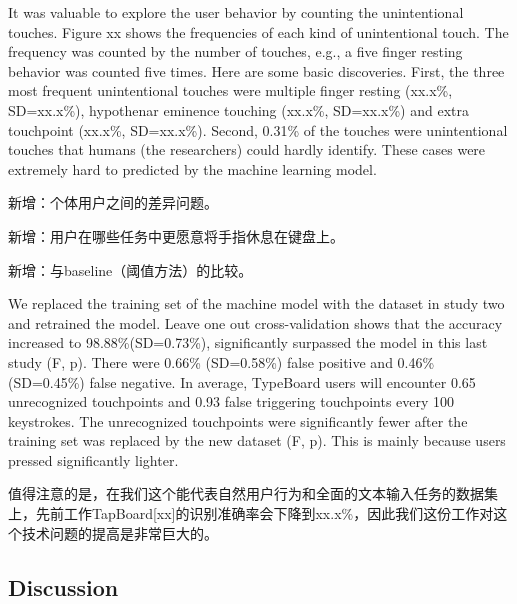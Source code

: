 
It was valuable to explore the user behavior by counting the unintentional touches. Figure xx shows the frequencies of each kind of unintentional touch. The frequency was counted by the number of touches, e.g., a five finger resting behavior was counted five times. Here are some basic discoveries. First, the three most frequent unintentional touches were multiple finger resting (xx.x\%, SD=xx.x\%), hypothenar eminence touching (xx.x\%, SD=xx.x\%) and extra touchpoint (xx.x\%, SD=xx.x\%). Second,
0.31\% of the touches were unintentional touches that humans (the researchers) could hardly identify. These cases were extremely hard to predicted by the machine learning model.

新增：个体用户之间的差异问题。

新增：用户在哪些任务中更愿意将手指休息在键盘上。

新增：与baseline（阈值方法）的比较。


We replaced the training set of the machine model with the dataset in study two and retrained the model. Leave one out cross-validation shows that the accuracy increased to 98.88\%(SD=0.73\%), significantly surpassed the model in this last study (F, p). There were 0.66\% (SD=0.58\%) false positive and 0.46\% (SD=0.45\%) false negative. In average, TypeBoard users will encounter 0.65 unrecognized touchpoints and 0.93 false triggering touchpoints every 100 keystrokes. The unrecognized touchpoints were significantly fewer after the training set was replaced by the new dataset (F, p). This is mainly because users pressed significantly lighter.

值得注意的是，在我们这个能代表自然用户行为和全面的文本输入任务的数据集上，先前工作TapBoard[xx]的识别准确率会下降到xx.x\%，因此我们这份工作对这个技术问题的提高是非常巨大的。


\subsection{Discussion}

